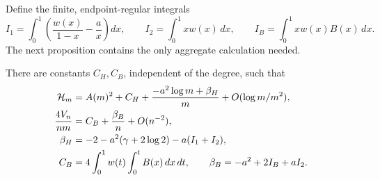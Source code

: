 Define the finite, endpoint-regular integrals
\[
 I_1=\int_0^1\left(\frac{w(x)}{1-x}-\frac ax\right)dx,
 \qquad I_2=\int_0^1xw(x)\,dx,\qquad I_B=\int_0^1xw(x)B(x)\,dx.
\]
The next proposition contains the only aggregate calculation needed.
\begin{proposition}\label{cu:aggregate}
There are constants $C_H,C_B$, independent of the degree, such that
\begin{align}
 \mathcal H_m&=A(m)^2+C_H+
       \frac{-a^2\log m+\beta_H}{m}+O(\log m/m^2),\label{cu:H}\\
 \frac{4V_n}{nm}&=C_B+\frac{\beta_B}{n}+O(n^{-2}),\label{cu:V}\\
 \beta_H&=-2-a^2(\gamma+2\log2)-a(I_1+I_2),\notag\\
 C_B&=4\int_0^1w(t)\int_0^tB(x)\,dx\,dt,
 \qquad \beta_B=-a^2+2I_B+aI_2.\notag
\end{align}
\end{proposition}
